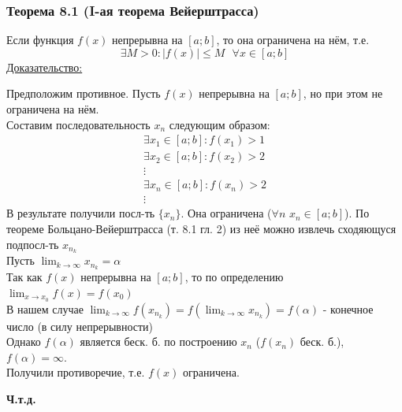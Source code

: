 \documentclass[12pt]{article}
\def\posl#1#2{\{#1_{#2}\}}
\begin{document}
    \subsubsection*{Теорема 8.1 (I-ая теорема Вейерштрасса)}
    Если функция $f(x)$ непрерывна на $[a; b]$, то она ограничена на нём, т.е.
    \[ \exists M > 0 : \left|f(x)\right| \le M \text{ } \forall x \in [a; b] \]\noindent
    \underline{Доказательство:}
    \begin{adjustwidth}{1.5em}{1.5em}
        Предположим противное. Пусть $f(x)$ непрерывна на $[a; b]$, но при этом не ограничена на нём.\\
        Составим последовательность $x_n$ следующим образом:
            \begin{gather*}
                \exists x_1 \in [a; b] : f(x_1) > 1\\
                \exists x_2 \in [a; b] : f(x_2) > 2\\
                \vdots\\
                \exists x_n \in [a; b] : f(x_n) > 2\\
                \vdots
            \end{gather*}
        В результате получили посл-ть $\posl{x}{n}$. Она ограничена ($\forall n$ $x_n \in [a; b]$). По теореме Больцано-Вейерштрасса (т. 8.1 гл. 2) из неё можно извлечь сходяющуся подпосл-ть $x_{n_k}$\\
        Пусть $\lim_{k\to\infty}x_{n_k} = \alpha$\\
        Так как $f(x)$ непрерывна на $[a; b]$, то по определению $\lim_{x\to x_0} f(x) = f(x_0)$\\
        В нашем случае $\lim_{k\to\infty} f(x_{n_k}) = f(\lim_{k\to\infty}x_{n_{k}}) = f(\alpha)$ - конечное число (в силу непрерывности)\\
        Однако $f(\alpha)$ является беск. б. по построению $x_n$ ($f(x_n)$ беск. б.), $f(\alpha) = \infty$.\\
        Получили противоречие, т.е. $f(x)$ ограничена.
        \begin{center}
            \textbf{Ч.т.д.}
        \end{center} 
    \end{adjustwidth}
\end{document}
